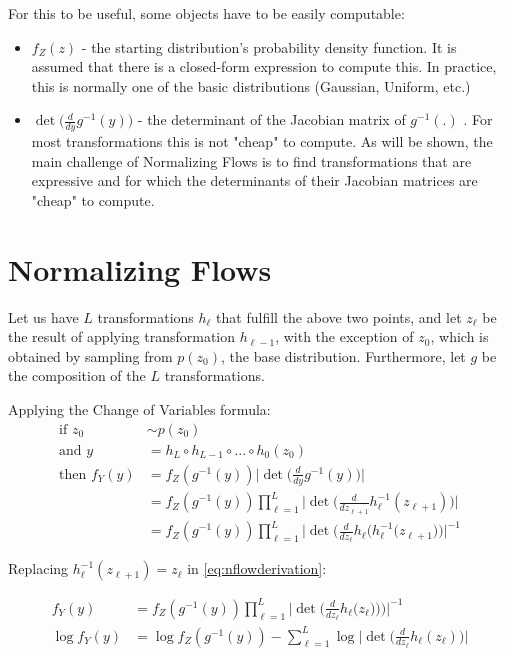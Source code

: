 For this to be useful, some objects have to be easily computable:
\begin{itemize}
    \item $f_Z(z)$ - the starting distribution's probability density function.
        It is assumed that there is a closed-form expression to compute this. In
        practice, this is normally one of the basic distributions (Gaussian,
        Uniform, etc.)
    \item $\det\Big(\frac{d}{dy}g^{-1}(y)\Big)$ - the determinant  of the Jacobian
        matrix of $g^{-1}(.)$ . For most transformations this is not "cheap" to compute.
        As will be shown, the main challenge of Normalizing Flows is to find
        transformations that are expressive and for which 
        the determinants of their Jacobian matrices are "cheap" to compute.
\end{itemize}

\section{Normalizing Flows}
Let us have $L$ transformations $h_\ell$ that fulfill the above two points, and
let $z_\ell$ be the result of applying transformation $h_{\ell-1}$, with the
exception of $z_0$, which is obtained by sampling from $p(z_0)$, the base distribution.
Furthermore, let $g$ be the composition of the $L$ transformations.

Applying the Change of Variables formula:
\begin{align}
    \mbox{if } z_0 &\sim p(z_0) \\
    \mbox{and } y &= h_L \circ h_{L-1} \circ ... \circ h_0(z_0) \\
    \mbox{then } f_Y(y) &= f_Z(g^{-1}(y))\Big|\det\Big(\frac{d}{dy}g^{-1}(y)\Big)\Big| \\
                        &= f_Z(g^{-1}(y))\prod_{\ell=1}^{L}\Big|\det\Big(\frac{d}{dz_{\ell+1}}h_{\ell}^{-1}(z_{\ell+1})\Big)\Big| \\
                        &= f_Z(g^{-1}(y))\prod_{\ell=1}^{L}\Big|\det\Big(\frac{d}{dz_{\ell}}h_{\ell}\Big(h_{\ell}^{-1}(z_{\ell+1}\Big)\Big)\Big|^{-1} \label{eq:nflowderivation}
\end{align}

Replacing $h_{\ell}^{-1}(z_{\ell+1}) = z_\ell$ in \ref{eq:nflowderivation}:

\begin{align}
         f_Y(y) &= f_Z(g^{-1}(y))\prod_{\ell=1}^{L}\Big|\det\Big(\frac{d}{dz_{\ell}}h_{\ell}\Big(z_\ell)\Big)\Big)\Big|^{-1} \\
    \log f_Y(y) &= \log f_Z(g^{-1}(y)) - \sum_{\ell=1}^{L} \log \Big|\det\Big(\frac{d}{dz_{\ell}}h_{\ell}(z_\ell)\Big) \Big| \label{eq:nflowsfinal}
\end{align}

